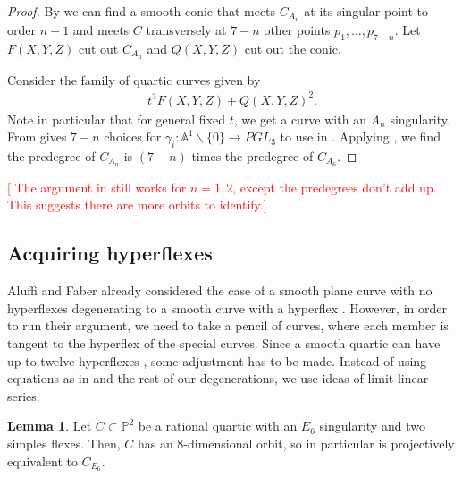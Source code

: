 \documentclass{article}
\newcommand{\rood}[1]{\textcolor{red}{[#1]}}
\theoremstyle{definition}
\newtheorem{lem}[thm]{Lemma}
\newcommand{\mb}{\mathbb}
\begin{document}
\begin{proof}
By  we can find a smooth conic that meets $C_{A_n}$ at its singular point to order $n+1$ and meets $C$ transversely at $7-n$ other points $p_1,\ldots,p_{7-n}$. Let $F(X,Y,Z)$ cut out $C_{A_n}$ and $Q(X,Y,Z)$ cut out the conic. 

Consider the family of quartic curves given by
\begin{align*}
    t^3 F(X,Y,Z)+Q(X,Y,Z)^2.
\end{align*}
Note in particular that for general fixed $t$, we get a curve with an $A_n$ singularity. From  gives $7-n$ choices for $\gamma_i: \mb{A}^{1}\backslash\{0\}\to PGL_3$ to use in . Applying \cite[Example 5.4]{AF00}, we find the predegree of $C_{A_n}$ is $(7-n)$ times the predegree of $C_{A_6}$. 
\end{proof}

\rood{
The argument in  still works for $n=1,2$, except the predegrees don't add up. This suggests there are more orbits to identify.}
\subsection{Acquiring hyperflexes}
Aluffi and Faber already considered the case of a smooth plane curve with no hyperflexes degenerating to a smooth curve with a hyperflex \cite[Theorem IV(2)]{AF93P}. However, in order to run their argument, we need to take a pencil of curves, where each member is tangent to the hyperflex of the special curves. Since a smooth quartic can have up to twelve hyperflexes \cite[Section 4]{KK77}, some adjustment has to be made. Instead of using equations as in \cite{AF93P} and the rest of our degenerations, we use ideas of limit linear series. 

\begin{lem}
\label{E6}
Let $C\subset\mb{P}^2$ be a rational quartic with an $E_6$ singularity and two simples flexes. Then, $C$ has an 8-dimensional orbit, so in particular is projectively equivalent to $C_{E_6}$. 
\end{lem}
\end{document}
